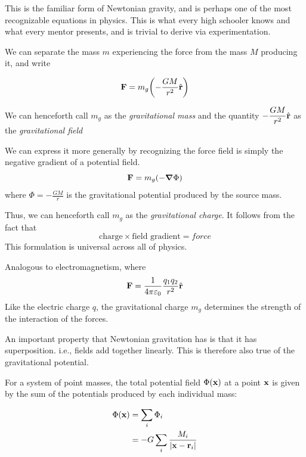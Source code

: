 		This is the familiar form of Newtonian gravity, and is perhaps one of the most recognizable equations in physics.
		This is what every high schooler knows and what every mentor presents, and is trivial to derive via experimentation.

		We can separate the mass $m$ experiencing the force from the mass $M$ producing it, and write

		\begin{equation}
			\vb{F} = m_g \qty(-\frac{GM}{r^2}\hat{\vb{r}})
		\end{equation}

		We can henceforth call $m_g$ as the \textit{gravitational mass} and the quantity $-\dfrac{GM}{r^2}\hat{\vb{r}}$ as the \textit{gravitational field}

		We can express it more generally by recognizing the force field is simply the negative gradient of a potential field.
		\begin{equation}
			\vb{F} = m_g\qty(-\grad\Phi)
			\label{eq: F = mg x -gradphi}
		\end{equation}
		where $\displaystyle \Phi = -\frac{GM}{r} $ is the gravitational potential produced by the source mass.

		Thus, we can henceforth call $m_g$ as the \textit{gravitational charge}. It follows from the fact that
		\begin{equation}
			\text{charge}\times \text{field gradient} = force
		\end{equation}
		This formulation is universal across all of physics.

		Analogous to electromagnetism, where 
		\begin{equation}
			\vb{F} = \frac{1}{4\pi\varepsilon_0} \frac{q_1 q_2}{r^2}\hat{\vb{r}} 
		\end{equation} 
		Like the electric charge $q$, the gravitational charge $m_g$ determines the strength of the interaction of the forces.

		An important property that Newtonian gravitation has is that it has superposition. i.e., fields add together linearly.
		This is therefore also true of the gravitational potential.

		For a system of point masses, the total potential field $\Phi(\vb{x})$ at a point $\vb{x}$ is given by the sum of the potentials produced by each individual mass:

		\begin{align*}
			\Phi(\vb{x}) &= \sum_i \Phi_i \\
						 &= -G\sum_i \frac{M_i}{\abs{\vb{x}-\vb{r}_i}} 
		\end{align*}

